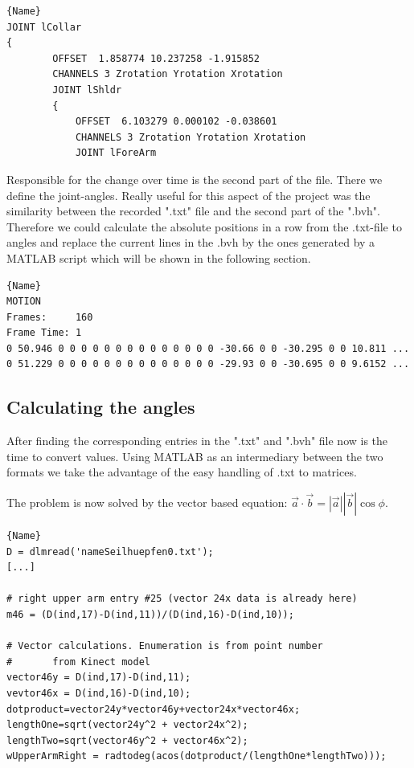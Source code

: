 \documentclass[a4paper]{article}
\begin{document}
\begin{lstlisting}[caption=.bvh Connected Structure. The connection is a tree-structure. Changes in parents will affect positions of children parts without(!) chaning their angle values.]{Name}
JOINT lCollar
{
		OFFSET	1.858774 10.237258 -1.915852
		CHANNELS 3 Zrotation Yrotation Xrotation
		JOINT lShldr
		{
			OFFSET	6.103279 0.000102 -0.038601
			CHANNELS 3 Zrotation Yrotation Xrotation
			JOINT lForeArm
\end{lstlisting}

Responsible for the change over time is the second part of the file.
There we define the joint-angles.
Really useful for this aspect of the project was the similarity between the recorded ".txt" file and the second part of the ".bvh".
Therefore we could calculate the absolute positions in a row from the .txt-file to angles and replace the current lines in the .bvh by the ones generated by a MATLAB script which will be shown in the following section.

\begin{lstlisting}[caption=Motionpart of .bvh. It's including the information about the number of total frames aswell as the time per frame and a line containing angle values for each frame.]{Name}
MOTION
Frames:     160
Frame Time: 1                
0 50.946 0 0 0 0 0 0 0 0 0 0 0 0 0 0 -30.66 0 0 -30.295 0 0 10.811 ...
0 51.229 0 0 0 0 0 0 0 0 0 0 0 0 0 0 -29.93 0 0 -30.695 0 0 9.6152 ...
\end{lstlisting}

\subsection{Calculating the angles}

After finding the corresponding entries in the ".txt" and ".bvh" file now is the time to convert values.
Using MATLAB as an intermediary between the two formats we take the advantage of the easy handling of .txt to matrices.

The problem is now solved by the vector based equation: $\vec a \cdot \vec b = \left|\vec a \right| \left|\vec b \right| \cos \phi$.

\begin{lstlisting}[caption=Calculating the angle. Each calculation requires two vectors which need to be extracted from the absolute kinect point. After calculating the lenght of them both we can insert these values into the formula and receive the angle needed.]{Name}
D = dlmread('nameSeilhuepfen0.txt');
[...]

# right upper arm entry #25 (vector 24x data is already here)
m46 = (D(ind,17)-D(ind,11))/(D(ind,16)-D(ind,10));

# Vector calculations. Enumeration is from point number
#       from Kinect model
vector46y = D(ind,17)-D(ind,11);
vevtor46x = D(ind,16)-D(ind,10);
dotproduct=vector24y*vector46y+vector24x*vector46x;
lengthOne=sqrt(vector24y^2 + vector24x^2);
lengthTwo=sqrt(vector46y^2 + vector46x^2); 
wUpperArmRight = radtodeg(acos(dotproduct/(lengthOne*lengthTwo)));
\end{lstlisting}
\end{document}
